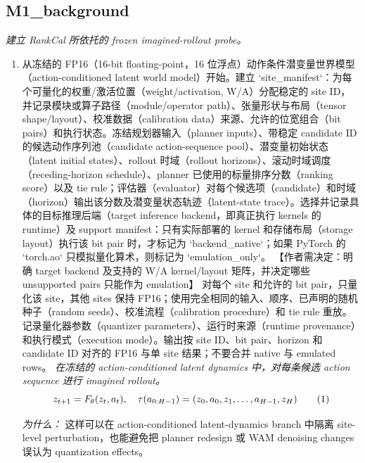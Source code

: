 \documentclass[10pt,a4paper]{article}
\begin{document}
\subsection*{M1\_background}
\emph{建立 RankCal 所依托的 frozen imagined-rollout probe。}
\begin{enumerate}[leftmargin=*,start=1]
  \item 从冻结的 FP16（16-bit floating-point，16 位浮点）动作条件潜变量世界模型（action-conditioned latent world model）开始。建立 `site\_manifest`：为每个可量化的权重/激活位置（weight/activation, W/A）分配稳定的 site ID，并记录模块或算子路径（module/operator path）、张量形状与布局（tensor shape/layout）、校准数据（calibration data）来源、允许的位宽组合（bit pairs）和执行状态。冻结规划器输入（planner inputs）、带稳定 candidate ID 的候选动作序列池（candidate action-sequence pool）、潜变量初始状态（latent initial states）、rollout 时域（rollout horizons）、滚动时域调度（receding-horizon schedule）、planner 已使用的标量排序分数（ranking score）以及 tie rule；评估器（evaluator）对每个候选项（candidate）和时域（horizon）输出该分数及潜变量状态轨迹（latent-state trace）。选择并记录具体的目标推理后端（target inference backend，即真正执行 kernels 的 runtime）及 support manifest：只有实际部署的 kernel 和存储布局（storage layout）执行该 bit pair 时，才标记为 `backend\_native`；如果 PyTorch 的 `torch.ao` 只模拟量化算术，则标记为 `emulation\_only`。 【作者需决定：明确 target backend 及支持的 W/A kernel/layout 矩阵，并决定哪些 unsupported pairs 只能作为 emulation】 对每个 site 和允许的 bit pair，只量化该 site，其他 sites 保持 FP16；使用完全相同的输入、顺序、已声明的随机种子（random seeds）、校准流程（calibration procedure）和 tie rule 重放。记录量化器参数（quantizer parameters）、运行时来源（runtime provenance）和执行模式（execution mode）。输出按 site ID、bit pair、horizon 和 candidate ID 对齐的 FP16 与单 site 结果；不要合并 native 与 emulated rows。
\noindent\emph{在冻结的 action-conditioned latent dynamics 中，对每条候选 action sequence 进行 imagined rollout。}
\begin{equation}
\resizebox{\ifdim\width>\linewidth \linewidth\else\width\fi}{!}{$\displaystyle z_{t+1}=F_{\theta}(z_t,a_t),\quad \tau(a_{0:H-1})=(z_0,a_0,z_1,\ldots,a_{H-1},z_H)$} \tag{1}
\end{equation}
\par\emph{为什么：} 这样可以在 action-conditioned latent-dynamics branch 中隔离 site-level perturbation，也能避免把 planner redesign 或 WAM denoising changes 误认为 quantization effects。
\end{enumerate}
\end{document}
